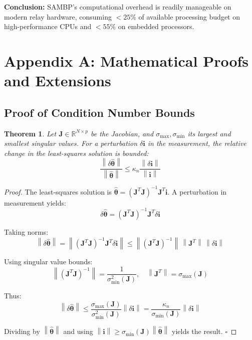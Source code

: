 \documentclass[12pt,a4paper]{article}
\newtheorem{theorem}{Theorem}[section]
\newcommand{\norm}[1]{\left\lVert#1\right\rVert}
\newcommand{\hattheta}{\hat{\boldsymbol{\theta}}}
\newcommand{\kappan}{\kappa_n}
\newcommand{\key}[1]{\textbf{\textcolor{blue!70!black}{#1}}}
\begin{document}
\key{Conclusion:} SAMBP's computational overhead is readily manageable on modern 
relay hardware, consuming $<25\%$ of available processing budget on high-performance 
CPUs and $<55\%$ on embedded processors.

\section{Appendix A: Mathematical Proofs and Extensions}
\label{app:proofs}

\subsection{Proof of Condition Number Bounds}
\label{app:proof_cond}

\begin{theorem}
\label{thm:cond_bound}
Let $\mathbf{J} \in \mathbb{R}^{N \times p}$ be the Jacobian, and $\sigma_{\max}, \sigma_{\min}$ 
its largest and smallest singular values. For a perturbation $\delta \mathbf{i}$ in the 
measurement, the relative change in the least-squares solution is bounded:
\begin{equation}
\frac{\norm{\delta \hattheta}}{\norm{\hattheta}} \leq \kappan \frac{\norm{\delta \mathbf{i}}}{\norm{\mathbf{i}}}
\end{equation}
\end{theorem}

\begin{proof}
The least-squares solution is $\hattheta = (\mathbf{J}^T \mathbf{J})^{-1} \mathbf{J}^T \mathbf{i}$. 
A perturbation in measurement yields:
\begin{equation}
\delta \hattheta = (\mathbf{J}^T \mathbf{J})^{-1} \mathbf{J}^T \delta \mathbf{i}
\end{equation}

Taking norms:
\begin{equation}
\norm{\delta \hattheta} = \norm{(\mathbf{J}^T \mathbf{J})^{-1} \mathbf{J}^T \delta \mathbf{i}} \leq \norm{(\mathbf{J}^T \mathbf{J})^{-1}} \, \norm{\mathbf{J}^T} \, \norm{\delta \mathbf{i}}
\end{equation}

Using singular value bounds:
\begin{equation}
\norm{(\mathbf{J}^T \mathbf{J})^{-1}} = \frac{1}{\sigma_{\min}^2(\mathbf{J})}, \quad \norm{\mathbf{J}^T} = \sigma_{\max}(\mathbf{J})
\end{equation}

Thus:
\begin{equation}
\norm{\delta \hattheta} \leq \frac{\sigma_{\max}(\mathbf{J})}{\sigma_{\min}^2(\mathbf{J})} \norm{\delta \mathbf{i}} = \frac{\kappan}{\sigma_{\min}(\mathbf{J})} \norm{\delta \mathbf{i}}
\end{equation}

Dividing by $\norm{\hattheta}$ and using $\norm{\mathbf{i}} \geq \sigma_{\min}(\mathbf{J}) \norm{\hattheta}$ yields the result. $\square$
\end{proof}
\end{document}
